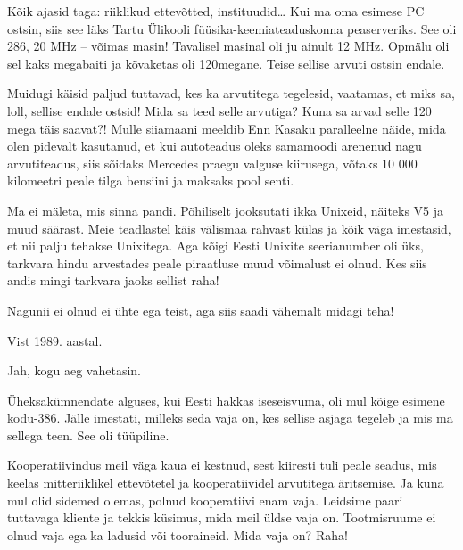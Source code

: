 
Kõik ajasid taga: riiklikud ettevõtted, instituudid\ldots{ }Kui ma oma 
esimese PC ostsin, siis see läks Tartu Ülikooli 
füüsika-keemiateaduskonna peaserveriks. See oli 286, 20 MHz -- võimas masin! Tavalisel masinal oli ju ainult 12 MHz. Opmälu oli sel kaks 
megabaiti ja kõvaketas oli 120megane. Teise sellise arvuti ostsin 
endale. 

Muidugi käisid paljud tuttavad, kes ka arvutitega tegelesid, vaatamas, 
et miks sa, loll, sellise endale ostsid! Mida sa teed selle arvutiga? Kuna 
sa arvad selle 120 mega täis saavat?! Mulle siiamaani 
meeldib Enn Kasaku paralleelne näide, mida olen pidevalt kasutanud, et kui autoteadus oleks samamoodi arenenud nagu 
arvutiteadus, siis sõidaks Mercedes praegu valguse kiirusega, võtaks 10 000 
kilomeetri peale tilga bensiini ja maksaks pool senti.


Ma ei mäleta, mis sinna pandi. Põhiliselt jooksutati 
ikka Unixeid, näiteks V5 ja muud säärast. 
Meie teadlastel käis välismaa rahvast külas ja kõik väga imestasid, 
et nii palju tehakse Unixitega. Aga kõigi Eesti Unixite seerianumber oli üks, 
tarkvara hindu arvestades peale piraatluse muud võimalust ei olnud. Kes siis 
andis mingi tarkvara jaoks sellist raha!


Nagunii ei olnud ei ühte ega teist, aga siis saadi vähemalt midagi teha!


Vist 1989. aastal.


Jah, kogu aeg vahetasin. 

Üheksakümnendate alguses, kui Eesti hakkas iseseisvuma, oli mul kõige esimene 
kodu-386. Jälle imestati, milleks seda vaja on, kes sellise asjaga tegeleb ja mis 
ma sellega teen. See oli tüüpiline.


Kooperatiivindus meil väga kaua ei kestnud, sest kiiresti 
tuli peale seadus, mis keelas mitteriiklikel ettevõtetel ja 
kooperatiividel arvutitega äritsemise. Ja kuna mul olid sidemed olemas, polnud 
kooperatiivi enam vaja. Leidsime paari tuttavaga kliente ja 
tekkis küsimus, mida meil üldse vaja on. Tootmisruume 
ei olnud vaja ega ka ladusid või tooraineid. Mida 
vaja on? Raha!

